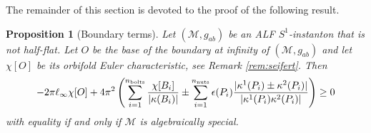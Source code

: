 \documentclass[a4paper,10pt,reqno]{amsart}
\newcommand{\nut}{P}
\newcommand{\bolt}{B}
\newcommand{\cM}{\mathcal{M}}
\theoremstyle{plain}
\newtheorem{prop}[thm]{Proposition}
\newcommand{\nnuts}{n_{\text{\rm nuts}}}
\newcommand{\nbolts}{n_{\text{\rm bolts}}}
\newcommand{\eps}{\epsilon}
\numberwithin{equation}{section}
\begin{document}
The remainder of this section is devoted to the proof of the following result.

\begin{prop}[Boundary terms] \label{prop:magbound} 
Let $(\cM, g_{ab})$ be an ALF $S^1$-instanton that is not half-flat. Let $O$ be the base of the boundary at infinity of $(\cM, g_{ab})$ and let $\chi[O]$ be its orbifold Euler characteristic, see Remark \ref{rem:seifert}.  Then
\begin{align}  \label{eq:magbound}
-2\pi \ell_\infty \chi[O]
+4\pi^2 \left(
\sum_{i=1}^{\nbolts} \frac{\chi[\bolt_i]}{|\kappa(\bolt_i)|}
\pm\sum_{i=1}^{\nnuts} \eps(\nut_i)
\frac{|\kappa^1(\nut_i) \pm \kappa^2(\nut_i)|}{|\kappa^1(\nut_i)\kappa^2(\nut_i)|}
\right)
\geq 0
\end{align}
with equality if and only if $\cM$ is algebraically special.
\end{prop} 
\end{document}
